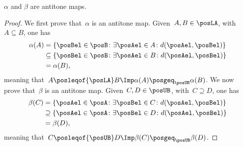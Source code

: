 \begin{lemma}
    \label{lem:alfabetaantitone}
    $\alpha$ and $\beta$ are antitone maps.
\end{lemma}
\begin{proof}
    We first prove that~$\alpha$ is an antitone map.
    Given~$A,B\in \posLA$, with~$A\subseteq B$, one has
    \begin{equation}
        \begin{aligned}
            \alpha(A) & =\{ \posBel\in \posB \colon \exists \posAel\in A\colon d(\posAel,\posBel)\}         \\
                      & \subseteq \{\posBel\in \posB \colon \exists \posAel\in B\colon d(\posAel,\posBel)\} \\
                      & =\alpha(B),
        \end{aligned}
    \end{equation}
    meaning that~$A\posleqof{\posLA} B\Imp \alpha(A) \posgeq_{\posUB} \alpha(B)$.
    We now prove that~$\beta$ is an antitone map.
    Given~$C,D\in \posUB$, with~$C\supseteq D$, one has
    \begin{equation}
        \begin{aligned}
            \beta(C) & =\{\posAel\in \posA\colon \exists \posBel\in C\colon d(\posAel,\posBel)\}           \\
                     & \supseteq \{\posAel\in \posA\colon \exists \posBel\in D \colon d(\posAel,\posBel)\} \\
                     & =\beta(D),
        \end{aligned}
    \end{equation}
    meaning that~$C\posleqof{\posUB} D \Imp \beta(C)\posgeq_{\posUB} \beta(D)$.
\end{proof}

